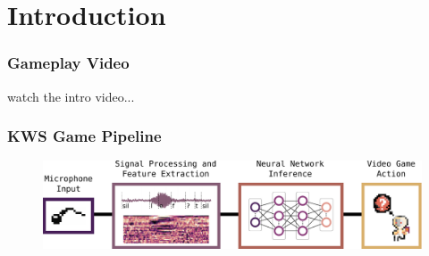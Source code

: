 
\section{Introduction}
\begin{frame}
  \frametitle{Gameplay Video}
  watch the intro video...
\end{frame}

\begin{frame}
  \frametitle{KWS Game Pipeline}
  \begin{figure} \includegraphics[width=1.0\textwidth]{../1_intro/figs/intro_kws.pdf} \end{figure}
\end{frame}